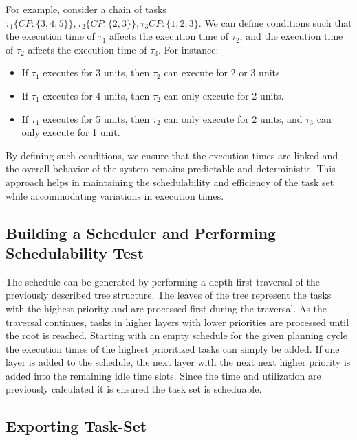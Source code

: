 For example, consider a chain of tasks \( \tau_1 \{ CP: \{3, 4, 5\}\}, \tau_2 \{ CP: \{2, 3\}\}, \tau_3 CP: \{1, 2, 3\} \).
We can define conditions such that the execution time of \( \tau_1 \) affects the execution time of \( \tau_2 \), and the execution time of \( \tau_2 \) affects the execution time of \( \tau_3 \). For instance:
\begin{itemize}
	\item If \( \tau_1 \) executes for 3 units, then \( \tau_2 \) can execute for 2 or 3 units.
	\item If \( \tau_1 \) executes for 4 units, then \( \tau_2 \) can only execute for 2 units.
	\item If \( \tau_1 \) executes for 5 units, then \( \tau_2 \) can only execute for 2 units, and \( \tau_3 \) can only execute for 1 unit.
\end{itemize}

By defining such conditions, we ensure that the execution times are linked and the overall behavior of the system remains predictable and deterministic. This approach helps in maintaining the schedulability and efficiency of the task set while accommodating variations in execution times.



\subsection{Building a Scheduler and Performing Schedulability Test}\label{sec:concept_scheduler}
The schedule can be generated by performing a depth-first traversal of the previously described tree structure.
The leaves of the tree represent the tasks with the highest priority and are processed first during the traversal.
As the traversal continues, tasks in higher layers with lower priorities are processed until the root is reached.
Starting with an empty schedule for the given planning cycle the execution times of the highest prioritized tasks can simply be added.
If one layer is added to the schedule, the next layer with the next next higher priority is added into the remaining idle time slots.
Since the time and utilization are previously calculated it is ensured the task set is scheduable.




\subsection{Exporting Task-Set}\label{sec:exporting_task_set}



